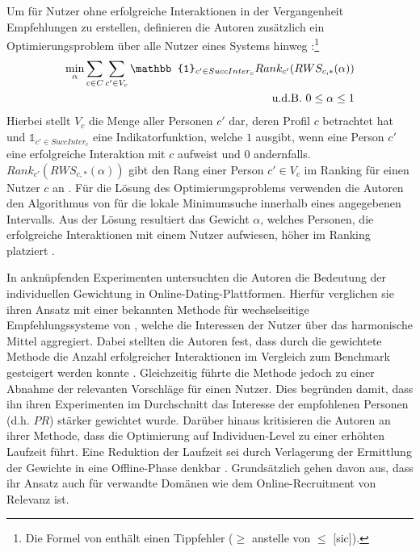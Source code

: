 Um für Nutzer ohne erfolgreiche Interaktionen in der Vergangenheit Empfehlungen zu erstellen, definieren die Autoren zusätzlich ein Optimierungsproblem über alle Nutzer eines Systems hinweg \cite[S. 135]{kleinerman:2:inproceedings}:\footnote{Die Formel von \textcite[S. 135]{kleinerman:2:inproceedings} enthält einen Tippfehler ($\geq$ anstelle von $\leq$ [sic]).}
\begin{equation}\label{eq37}
    \begin{aligned}
        \min_{\alpha} \sum_{c \in C} \sum_{c' \in V_{c}} \mathbb{1}_{c' \in SuccInter_{c}} Rank_{c'} (RWS_{c,*}(\alpha))\\
        \textnormal{u.d.B. } 0 \leq \alpha \leq 1\\
    \end{aligned}
\end{equation}
Hierbei stellt $V_{c}$ die Menge aller Personen $c'$ dar, deren Profil $c$ betrachtet hat und $\mathbb{1}_{c' \in SuccInter_{c}}$ eine Indikatorfunktion, welche $1$ ausgibt, wenn eine Person $c'$ eine erfolgreiche Interaktion mit $c$ aufweist und $0$ andernfalls.
$Rank_{c'} (RWS_{c,*}(\alpha))$ gibt den Rang einer Person $c' \in V_{c}$ im Ranking für einen Nutzer $c$ an \cite[S. 135]{kleinerman:2:inproceedings}.
Für die Lösung des Optimierungsproblems verwenden die Autoren den Algorithmus von \textcite[S. 422ff.]{brent:article} für die lokale Minimumsuche innerhalb eines angegebenen Intervalls.
Aus der Lösung resultiert das Gewicht $\alpha$, welches Personen, die erfolgreiche Interaktionen mit einem Nutzer aufwiesen, höher im Ranking platziert \cite[S. 135]{kleinerman:2:inproceedings}.

In anknüpfenden Experimenten untersuchten die Autoren die Bedeutung der individuellen Gewichtung in Online-Dating-Plattformen.
Hierfür verglichen sie ihren Ansatz mit einer bekannten Methode für wechselseitige Empfehlungssysteme von \textcite[S. 6]{xia:inproceedings}, welche die Interessen der Nutzer über das harmonische Mittel aggregiert.
Dabei stellten die Autoren fest, dass durch die gewichtete Methode die Anzahl erfolgreicher Interaktionen im Vergleich zum Benchmark gesteigert werden konnte \cite[S. 132]{kleinerman:2:inproceedings}.
Gleichzeitig führte die Methode jedoch zu einer Abnahme der relevanten Vorschläge für einen Nutzer.
Dies begründen \textcite[S. 132]{kleinerman:2:inproceedings} damit, dass ihn ihren Experimenten im Durchschnitt das Interesse der empfohlenen Personen (d.h. $PR$) stärker gewichtet wurde.
Darüber hinaus kritisieren die Autoren an ihrer Methode, dass die Optimierung auf Individuen-Level zu einer erhöhten Laufzeit führt.
Eine Reduktion der Laufzeit sei durch Verlagerung der Ermittlung der Gewichte in eine Offline-Phase denkbar \cite[S. 138]{kleinerman:2:inproceedings}.
Grundsätzlich gehen  \textcite[S. 138]{kleinerman:2:inproceedings} davon aus, dass ihr Ansatz auch für verwandte Domänen wie dem Online-Recruitment von Relevanz ist.

